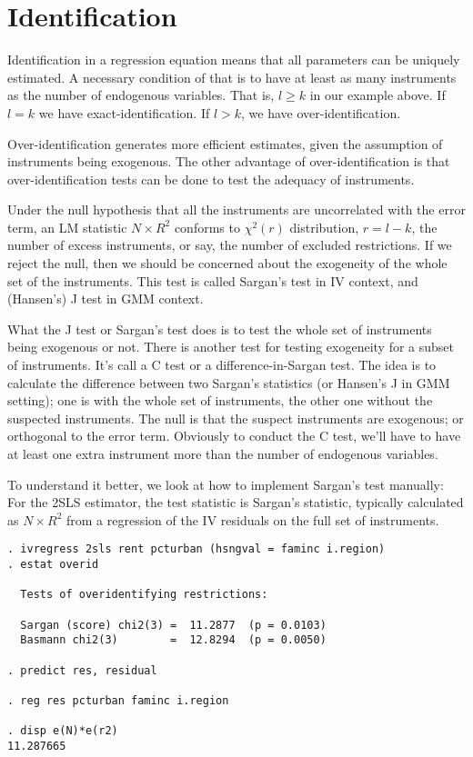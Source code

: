 \section{Identification}

Identification in a regression equation means that all parameters can
be uniquely estimated.  A necessary condition of that is to have at
least as many instruments as the number of endogenous variables.  That
is, $l \ge k$ in our example above.  If $l=k$ we have
exact-identification.  If $l>k$, we have over-identification.  

Over-identification generates more efficient estimates, given the
assumption of instruments being exogenous.  The other advantage of
over-identification is that over-identification tests can be done to
test the adequacy of instruments.

Under the null hypothesis that all the instruments are uncorrelated
with the error term, an LM statistic  $N \times R^2$ conforms to
$\chi^2 (r)$ distribution, $r=l-k$, the number of excess instruments,
 or say, the number of excluded restrictions.  If we reject the null,
 then we should be concerned about the exogeneity of the whole set of
 the instruments.  This test is called Sargan's test in IV context, and
 (Hansen's) J test in GMM context.  

 What the J test or Sargan's test does is to test the whole set of
 instruments being exogenous or not.  There is another test for
 testing exogeneity for a subset of instruments.  It's call a C test
 or a difference-in-Sargan test.  The idea is to calculate the
 difference between two Sargan's statistics (or Hansen's J in GMM
 setting); one is with the whole set of instruments, the other one
 without the suspected instruments.  The null is that the suspect
 instruments are exogenous; or orthogonal to the error term.
 Obviously to conduct the C test, we'll have to have at least one
 extra instrument more than the number of endogenous variables.

 To understand it better, we look at how to implement Sargan's test
 manually: For the 2SLS estimator, the test statistic is Sargan's
 statistic, typically calculated as $N \times R^2$ from a regression of
 the IV residuals on the full set of instruments.

\begin{verbatim}
. ivregress 2sls rent pcturban (hsngval = faminc i.region)
. estat overid

  Tests of overidentifying restrictions:

  Sargan (score) chi2(3) =  11.2877  (p = 0.0103)
  Basmann chi2(3)        =  12.8294  (p = 0.0050)

. predict res, residual

. reg res pcturban faminc i.region

. disp e(N)*e(r2)
11.287665
\end{verbatim}




